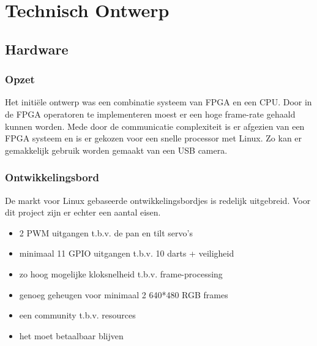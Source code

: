 \chapter{Technisch Ontwerp}


\section{Hardware}
\label{sec:hardware}

\subsection{Opzet}
\label{sub:opzet}
Het initiële ontwerp was een combinatie systeem van FPGA en een CPU. Door in 
de FPGA operatoren te implementeren moest er een hoge frame-rate gehaald kunnen 
worden. Mede door de communicatie complexiteit is er afgezien van een FPGA 
systeem en is er gekozen voor een snelle processor met Linux. Zo kan er gemakkelijk 
gebruik worden gemaakt van een USB camera.

\subsection{Ontwikkelingsbord}
\label{sub:devboard}
De markt voor Linux gebaseerde ontwikkelingsbordjes is redelijk uitgebreid. Voor 
dit project zijn er echter een aantal eisen.

\begin{itemize}
	\item 2 PWM uitgangen t.b.v. de pan en tilt servo's
	\item minimaal 11 GPIO uitgangen t.b.v. 10 darts + veiligheid
	\item zo hoog mogelijke kloksnelheid t.b.v. frame-processing
	\item genoeg geheugen voor minimaal 2 640*480 RGB frames
	\item een community t.b.v. resources
	\item het moet betaalbaar blijven
\end{itemize}

